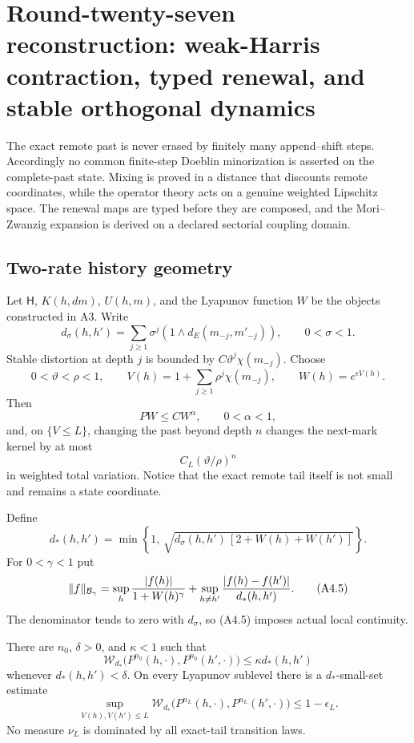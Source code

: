 \section{Round-twenty-seven reconstruction: weak-Harris contraction, typed renewal, and stable orthogonal dynamics}
\label{sec:r27-a4}

The exact remote past is never erased by finitely many append--shift steps.
Accordingly no common finite-step Doeblin minorization is asserted on the
complete-past state.  Mixing is proved in a distance that discounts remote
coordinates, while the operator theory acts on a genuine weighted Lipschitz
space.  The renewal maps are typed before they are composed, and the
Mori--Zwanzig expansion is derived on a declared sectorial coupling domain.

\subsection{Two-rate history geometry}

Let $\mathsf H$, $K(h,dm)$, $U(h,m)$, and the Lyapunov function $W$ be the
objects constructed in A3.  Write
\[
 d_\sigma(h,h')=\sum_{j\ge1}\sigma^j
   (1\wedge d_E(m_{-j},m'_{-j})),\qquad0<\sigma<1.
\]
Stable distortion at depth $j$ is bounded by
$C\vartheta^j\chi(m_{-j})$.  Choose
\[
 0<\vartheta<\rho<1,\qquad
 V(h)=1+\sum_{j\ge1}\rho^j\chi(m_{-j}),\qquad
 W(h)=e^{\epsilon V(h)}.                                  \tag{A4.1}
\]
Then
\[
 PW\le C W^\alpha,\qquad0<\alpha<1,                       \tag{A4.2}
\]
and, on $\{V\le L\}$, changing the past beyond depth $n$ changes the next-mark
kernel by at most
\[
 C_L(\vartheta/\rho)^n                                   \tag{A4.3}
\]
in weighted total variation.  Notice that the exact remote tail itself is
not small and remains a state coordinate.

Define
\[
 d_*(h,h')=\min\left\{1,\,
 \sqrt{d_\sigma(h,h')\,[2+W(h)+W(h')]}\right\}.            \tag{A4.4}
\]
For $0<\gamma<1$ put
\[
 \|f\|_{\mathcal B_\gamma}
 =\sup_h{|f(h)|\over1+W(h)^\gamma}
 +\sup_{h\ne h'}{|f(h)-f(h')|\over d_*(h,h')}.             \tag{A4.5}
\]
The denominator tends to zero with $d_\sigma$, so (A4.5) imposes actual local
continuity.

\begin{lemma}
\label{lem:r27-a4-local}
There are $n_0$, $\delta>0$, and $\kappa<1$ such that
\[
 \mathcal W_{d_*}\bigl(P^{n_0}(h,\cdot),P^{n_0}(h',\cdot)\bigr)
 \le\kappa d_*(h,h')                                     \tag{A4.6}
\]
whenever $d_*(h,h')<\delta$.  On every Lyapunov sublevel there is a
$d_*$-small-set estimate
\[
 \sup_{V(h),V(h')\le L}
 \mathcal W_{d_*}\bigl(P^{n_L}(h,\cdot),P^{n_L}(h',\cdot)\bigr)
 \le1-\epsilon_L.                                        \tag{A4.7}
\]
No measure $\nu_L$ is dominated by all exact-tail transition laws.
\end{lemma}

